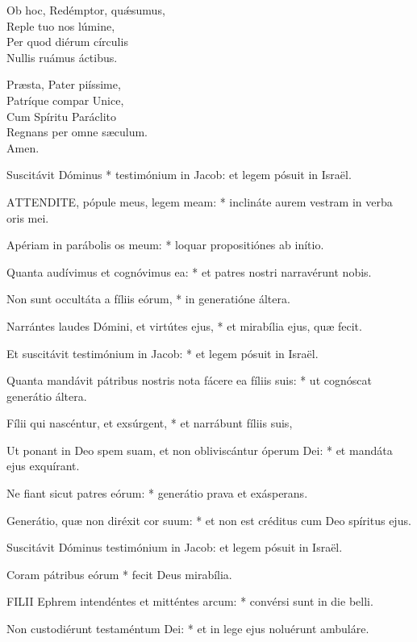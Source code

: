 Ob hoc, Redémptor, quǽsumus,\\
Reple tuo nos lúmine,\\
Per quod diérum círculis\\
Nullis ruámus áctibus.

Præsta, Pater piíssime,\\
Patríque compar Unice,\\
Cum Spíritu Paráclito\\
Regnans per omne sæculum.\\
Amen.


 Suscitávit Dóminus * testimónium in Jacob: et legem pósuit in Israël.


\lettrine[lines=2]{A}{TTENDITE}, pópule meus, legem meam: * inclináte aurem vestram in verba oris mei.

Apériam in parábolis os meum: * loquar propositiónes ab inítio.

Quanta audívimus et cognóvimus ea: * et patres nostri narravérunt nobis.

Non sunt occultáta a fíliis eórum, * in generatióne áltera.

Narrántes laudes Dómini, et virtútes ejus, * et mirabília ejus, quæ fecit.

Et suscitávit testimónium in Jacob: * et legem pósuit in Israël.

Quanta mandávit pátribus nostris nota fácere ea fíliis suis: * ut cognóscat generátio áltera.

Fílii qui nascéntur, et exsúrgent, * et narrábunt fíliis suis,

Ut ponant in Deo spem suam, et non obliviscántur óperum Dei: * et mandáta ejus exquírant.

Ne fiant sicut patres eórum: * generátio prava et exásperans.

Generátio, quæ non diréxit cor suum: * et non est créditus cum Deo spíritus ejus.

 Suscitávit Dóminus testimónium in Jacob: et legem pósuit in Israël.

 Coram pátribus eórum * fecit Deus mirabília.


\lettrine[lines=2]{F}{ILII} Ephrem intendéntes et mitténtes arcum: * convérsi sunt in die belli.

Non custodiérunt testaméntum Dei: * et in lege ejus noluérunt ambuláre.

